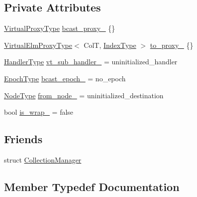 \subsection*{Private Attributes}
\begin{DoxyCompactItemize}
\item 
\hyperlink{namespacevt_a1b417dd5d684f045bb58a0ede70045ac}{Virtual\+Proxy\+Type} \hyperlink{structvt_1_1vrt_1_1collection_1_1_collection_message_a7b1563ec7a2d15faba3b252304beefb6}{bcast\+\_\+proxy\+\_\+} \{\}
\item 
\hyperlink{namespacevt_1_1vrt_a620a5c8c59d13e513f690c74b4af516f}{Virtual\+Elm\+Proxy\+Type}$<$ ColT, \hyperlink{structvt_1_1vrt_1_1collection_1_1_collection_message_a324978c38e67d1bfa86c8db172e77594}{Index\+Type} $>$ \hyperlink{structvt_1_1vrt_1_1collection_1_1_collection_message_ad2fbe6becd494f4983479600010ec39b}{to\+\_\+proxy\+\_\+} \{\}
\item 
\hyperlink{namespacevt_af64846b57dfcaf104da3ef6967917573}{Handler\+Type} \hyperlink{structvt_1_1vrt_1_1collection_1_1_collection_message_a6886f8da35617183db4aa87b259ec7df}{vt\+\_\+sub\+\_\+handler\+\_\+} = uninitialized\+\_\+handler
\item 
\hyperlink{namespacevt_a985a5adf291c34a3ca263b3378388236}{Epoch\+Type} \hyperlink{structvt_1_1vrt_1_1collection_1_1_collection_message_a60590aa9601e302e944e57a28d6d6600}{bcast\+\_\+epoch\+\_\+} = no\+\_\+epoch
\item 
\hyperlink{namespacevt_a866da9d0efc19c0a1ce79e9e492f47e2}{Node\+Type} \hyperlink{structvt_1_1vrt_1_1collection_1_1_collection_message_aa129673e8d91d5e3e662f15ae0d8d5fa}{from\+\_\+node\+\_\+} = uninitialized\+\_\+destination
\item 
bool \hyperlink{structvt_1_1vrt_1_1collection_1_1_collection_message_a026bbaa62fe0cb249e575792a4dfe1b6}{is\+\_\+wrap\+\_\+} = false
\end{DoxyCompactItemize}
\subsection*{Friends}
\begin{DoxyCompactItemize}
\item 
struct \hyperlink{structvt_1_1vrt_1_1collection_1_1_collection_message_af9288b1963f434a90b307b5305a49510}{Collection\+Manager}
\end{DoxyCompactItemize}


\subsection{Member Typedef Documentation}
\mbox{\label{structvt_1_1vrt_1_1collection_1_1_collection_message_afa8f7f5da0139ffa449144d8d35d7fe3}} 

